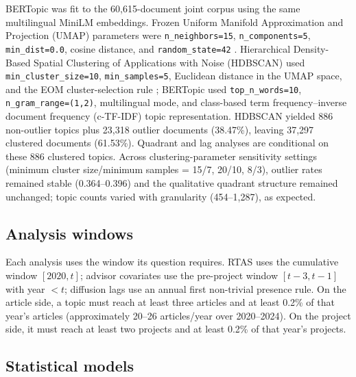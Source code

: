 \documentclass[11pt]{article}
\begin{document}
BERTopic \citep{grootendorst2022bertopic} was fit to the 60,615-document joint corpus using the same multilingual MiniLM embeddings. Frozen Uniform Manifold Approximation and Projection (UMAP) parameters were \texttt{n\_neighbors=15}, \texttt{n\_components=5}, \texttt{min\_dist=0.0}, cosine distance, and \texttt{random\_state=42} \citep{mcinnes2018umap}. Hierarchical Density-Based Spatial Clustering of Applications with Noise (HDBSCAN) used \texttt{min\_cluster\_size=10}, \texttt{min\_samples=5}, Euclidean distance in the UMAP space, and the EOM cluster-selection rule \citep{mcinnes2017hdbscan}; BERTopic used \texttt{top\_n\_words=10}, \texttt{n\_gram\_range=(1,2)}, multilingual mode, and class-based term frequency--inverse document frequency (c-TF-IDF) topic representation. HDBSCAN yielded 886 non-outlier topics plus 23,318 outlier documents (38.47\%), leaving 37,297 clustered documents (61.53\%). Quadrant and lag analyses are conditional on these 886 clustered topics. Across clustering-parameter sensitivity settings (minimum cluster size/minimum samples = 15/7, 20/10, 8/3), outlier rates remained stable (0.364--0.396) and the qualitative quadrant structure remained unchanged; topic counts varied with granularity (454--1,287), as expected.

\subsection{Analysis windows}

Each analysis uses the window its question requires. RTAS uses the cumulative window $[2020,t]$; advisor covariates use the pre-project window $[t-3,t-1]$ with year $<t$; diffusion lags use an annual first non-trivial presence rule. On the article side, a topic must reach at least three articles and at least 0.2\% of that year's articles (approximately 20--26 articles/year over 2020--2024). On the project side, it must reach at least two projects and at least 0.2\% of that year's projects.

\subsection{Statistical models}
\end{document}
